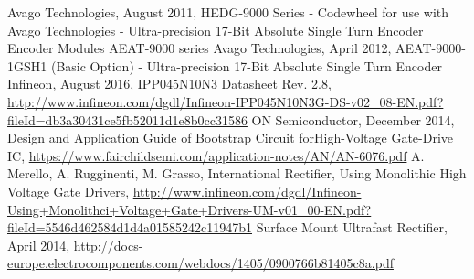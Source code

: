 \begin{thebibliography}{21} %
	Avago Technologies, August 2011, HEDG-9000 Series - Codewheel for use with Avago Technologies - Ultra-precision 17-Bit Absolute Single Turn Encoder
Encoder Modules AEAT-9000 series
	Avago Technologies, April 2012, AEAT-9000-1GSH1 (Basic Option) - Ultra-precision 17-Bit Absolute Single Turn Encoder
	Infineon, August 2016, IPP045N10N3 Datasheet Rev. 2.8, \url{http://www.infineon.com/dgdl/Infineon-IPP045N10N3G-DS-v02_08-EN.pdf?fileId=db3a30431ce5fb52011d1e8b0cc31586}
	ON Semiconductor, December 2014, Design and Application Guide of Bootstrap Circuit forHigh-Voltage Gate-Drive IC, \url{https://www.fairchildsemi.com/application-notes/AN/AN-6076.pdf}
	A. Merello, A. Rugginenti, M. Grasso, International Rectifier, Using Monolithic High Voltage Gate Drivers, \url{http://www.infineon.com/dgdl/Infineon-Using+Monolithci+Voltage+Gate+Drivers-UM-v01_00-EN.pdf?fileId=5546d462584d1d4a01585242c11947b1}
	Surface Mount Ultrafast Rectifier, April 2014, \url{http://docs-europe.electrocomponents.com/webdocs/1405/0900766b81405c8a.pdf}
\end{thebibliography}